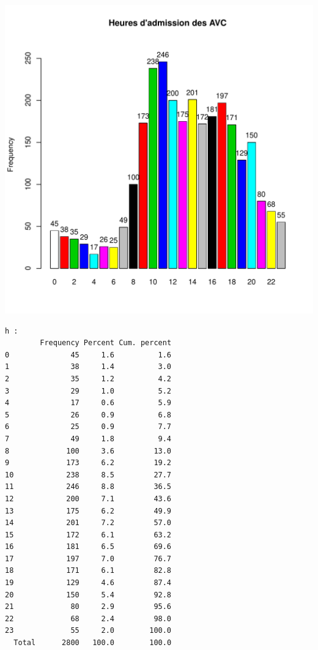 \documentclass[12pt,english,french,twoside]{book}\usepackage[]{graphicx}\usepackage[]{color}
\makeatletter
\def\maxwidth{ %
  \ifdim\Gin@nat@width>\linewidth
    \linewidth
  \else
    \Gin@nat@width
  \fi
}
\newenvironment{kframe}{%
 \def\at@end@of@kframe{}%
 \ifinner\ifhmode%
  \def\at@end@of@kframe{\end{minipage}}%
  \begin{minipage}{\columnwidth}%
 \fi\fi%
 \def\FrameCommand##1{\hskip\@totalleftmargin \hskip-\fboxsep
 \colorbox{shadecolor}{##1}\hskip-\fboxsep
     \hskip-\linewidth \hskip-\@totalleftmargin \hskip\columnwidth}%
 \MakeFramed {\advance\hsize-\width
   \@totalleftmargin\z@ \linewidth\hsize
   \@setminipage}}%
 {\par\unskip\endMakeFramed%
 \at@end@of@kframe}
\newenvironment{knitrout}{}{} %
\makeatother
\begin{document}
\begin{knitrout}
\color{fgcolor}
\includegraphics[width=\maxwidth]{figure/heure_avc2} 
\begin{kframe}\begin{verbatim}
h :  
        Frequency Percent Cum. percent
0              45     1.6          1.6
1              38     1.4          3.0
2              35     1.2          4.2
3              29     1.0          5.2
4              17     0.6          5.9
5              26     0.9          6.8
6              25     0.9          7.7
7              49     1.8          9.4
8             100     3.6         13.0
9             173     6.2         19.2
10            238     8.5         27.7
11            246     8.8         36.5
12            200     7.1         43.6
13            175     6.2         49.9
14            201     7.2         57.0
15            172     6.1         63.2
16            181     6.5         69.6
17            197     7.0         76.7
18            171     6.1         82.8
19            129     4.6         87.4
20            150     5.4         92.8
21             80     2.9         95.6
22             68     2.4         98.0
23             55     2.0        100.0
  Total      2800   100.0        100.0
\end{verbatim}
\end{kframe}
\end{knitrout}
\end{document}

